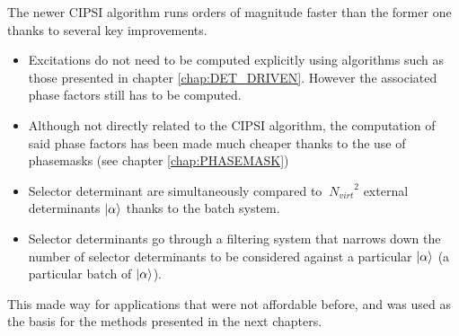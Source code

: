 \documentclass[./thesis.tex]{subfiles}
\begin{document}
The newer CIPSI algorithm runs orders of magnitude faster than the former one thanks to several key improvements.
\begin{itemize}
\item
Excitations do not need to be computed explicitly using algorithms such as those presented in chapter \ref{chap:DET_DRIVEN}. However the associated phase factors still has to be computed.
\item
Although not directly related to the CIPSI algorithm, the computation of said phase factors has been made much cheaper thanks to the use of phasemasks (see chapter \ref{chap:PHASEMASK})
\item
Selector determinant are simultaneously compared to $~{N_{virt}}^2$ external determinants ${\ket{\alpha}}$ thanks to the batch system.
\item
Selector determinants go through a filtering system that narrows down the number of selector determinants to be considered against a particular ${\ket{\alpha}}$ (a particular batch of ${\ket{\alpha}}$).
\end{itemize}

This made way for applications that were not affordable before,\cite{1806.05115} and was used as the basis for the methods presented in the next chapters.
\end{document}
